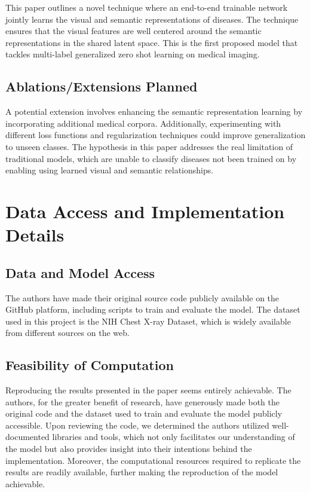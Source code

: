\documentclass[letterpaper]{article} %
\begin{document}
This paper outlines a novel technique where an end-to-end trainable network jointly
learns the visual and semantic representations of diseases. The technique ensures that
the visual features are well centered around the semantic representations in the
shared latent space. This is the first proposed model that tackles multi-label
generalized zero shot learning on medical imaging.

\subsection{Ablations/Extensions Planned}

A potential extension involves enhancing the semantic representation learning by
incorporating additional medical corpora. Additionally, experimenting with different
loss functions and regularization techniques could improve generalization to
unseen classes. The hypothesis in this paper addresses the real limitation of
traditional models, which are unable to classify diseases not been trained on by
enabling using learned visual and semantic relationships.

\section{Data Access and Implementation Details}

\subsection{Data and Model Access}

The authors have made their original source code publicly available on the GitHub
platform, including scripts to train and evaluate the model. The dataset used in this
project is the NIH Chest X-ray Dataset, which is widely available from different
sources on the web.

\subsection{Feasibility of Computation}

Reproducing the results presented in the paper seems entirely achievable. The authors, for the greater benefit of research, have generously made both the original code and the dataset used to train and evaluate the model publicly accessible. Upon reviewing the code, we determined the authors utilized well-documented libraries and tools, which not only facilitates our understanding of the model but also provides insight into their intentions behind the implementation. Moreover, the computational resources required to replicate the results are readily available, further making the reproduction of the model achievable.
\end{document}
